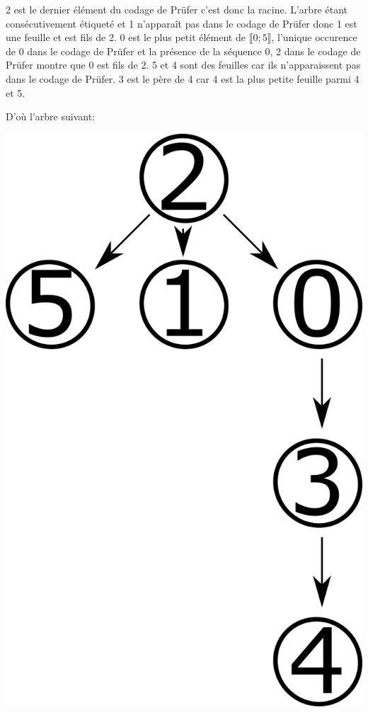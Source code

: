 \documentclass{article}
\begin{document}
			2 est le dernier élément du codage de Prüfer c'est donc la racine.
			L'arbre étant consécutivement étiqueté et 1 n'apparaît pas dans le codage de Prüfer donc 1 est une feuille et est fils de 2.
			0 est le plus petit élément de $\llbracket0; 5\rrbracket$, l'unique occurence de 0 dans le codage de Prüfer et la présence de la séquence 0, 2 dans le codage de Prüfer montre que 0 est fils de 2.
			5 et 4 sont des feuilles car ils n'apparaissent pas dans le codage de Prüfer.
			3 est le père de 4 car 4 est la plus petite feuille parmi 4 et 5.
			
			D'où l'arbre suivant:
		
			\includegraphics[scale=0.1]{IMG/PNG/28.png}
		
\end{document}
